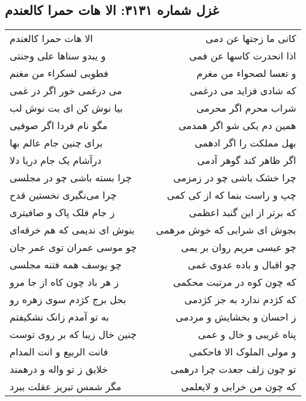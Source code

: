 \begin{center}
\section*{غزل شماره ۳۱۳۱: الا هات حمرا کالعندم}
\label{sec:3131}
\begin{longtable}{l p{0.5cm} r}
الا هات حمرا کالعندم
&&
کانی ما زجتها عن دمی
\\
و یبدو سناها علی وجنتی
&&
اذا انحدرت کاسها عن فمی
\\
فطوبی لسکراء من مغنم
&&
و تعسا لصحواء من مغرم
\\
می درغمی خور اگر در غمی
&&
که شادی فزاید می درغمی
\\
بیا نوش کن ای بت نوش لب
&&
شراب محرم اگر محرمی
\\
مگو نام فردا اگر صوفیی
&&
همین دم یکی شو اگر همدمی
\\
برای چنین جام عالم بها
&&
بهل مملکت را اگر ادهمی
\\
درآشام یک جام دریا دلا
&&
اگر ظاهر کند گوهر آدمی
\\
چرا بسته باشی چو در مجلسی
&&
چرا خشک باشی چو در زمزمی
\\
چرا می‌نگیری نخستین قدح
&&
چپ و راست بنما که از کی کمی
\\
ز جام فلک پاک و صافیتری
&&
که برتر از این گنبد اعظمی
\\
بنوش ای ندیمی که هم خرقه‌ای
&&
بجوش ای شرابی که خوش مرهمی
\\
چو موسی عمران توی عمر جان
&&
چو عیسی مریم روان بر یمی
\\
چو یوسف همه فتنه مجلسی
&&
چو اقبال و باده عدوی غمی
\\
ز هر باد چون کاه از جا مرو
&&
که چون کوه در مرتبت محکمی
\\
بحل برج کژدم سوی زهره رو
&&
که کژدم ندارد به جز کژدمی
\\
به تو آمدم زانک نشکیفتم
&&
ز احسان و بخشایش و مردمی
\\
چنین خال زیبا که بر روی توست
&&
پناه غریبی و خال و عمی
\\
فانت الربیع و انت المدام
&&
و مولی الملوک الا فاحکمی
\\
خلایق ز تو واله و درهمند
&&
تو چون زلف جعدت چرا درهمی
\\
مگر شمس تبریز عقلت ببرد
&&
که چون من خرابی و لایعلمی
\\
\end{longtable}
\end{center}
